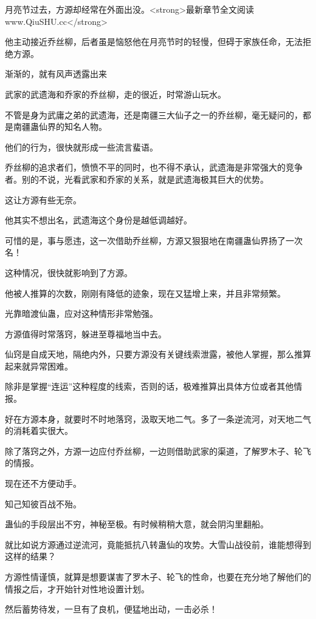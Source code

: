 
\begin{this_body}

月亮节过去，方源却经常在外面出没。<strong>最新章节全文阅读www.QiuSHU.cc</strong>

他主动接近乔丝柳，后者虽是恼怒他在月亮节时的轻慢，但碍于家族任命，无法拒绝方源。

渐渐的，就有风声透露出来

武家的武遗海和乔家的乔丝柳，走的很近，时常游山玩水。

不管是身为武庸之弟的武遗海，还是南疆三大仙子之一的乔丝柳，毫无疑问的，都是南疆蛊仙界的知名人物。

他们的行为，很快就形成一些流言蜚语。

乔丝柳的追求者们，愤愤不平的同时，也不得不承认，武遗海是非常强大的竞争者。别的不说，光看武家和乔家的关系，就是武遗海极其巨大的优势。

这让方源有些无奈。

他其实不想出名，武遗海这个身份是越低调越好。

可惜的是，事与愿违，这一次借助乔丝柳，方源又狠狠地在南疆蛊仙界扬了一次名！

这种情况，很快就影响到了方源。

他被人推算的次数，刚刚有降低的迹象，现在又猛增上来，并且非常频繁。

光靠暗渡仙蛊，应对这种情形非常勉强。

方源值得时常落窍，躲进至尊福地当中去。

仙窍是自成天地，隔绝内外，只要方源没有关键线索泄露，被他人掌握，那么推算起来就异常困难。

除非是掌握“连运”这种程度的线索，否则的话，极难推算出具体方位或者其他情报。

好在方源本身，就要时不时地落窍，汲取天地二气。多了一条逆流河，对天地二气的消耗着实很大。

除了落窍之外，方源一边应付乔丝柳，一边则借助武家的渠道，了解罗木子、轮飞的情报。

现在还不方便动手。

知己知彼百战不殆。

蛊仙的手段层出不穷，神秘至极。有时候稍稍大意，就会阴沟里翻船。

就比如说方源通过逆流河，竟能抵抗八转蛊仙的攻势。大雪山战役前，谁能想得到这样的结果？

方源性情谨慎，就算是想要谋害了罗木子、轮飞的性命，也要在充分地了解他们的情报之后，才开始针对性地设置计划。

然后蓄势待发，一旦有了良机，便猛地出动，一击必杀！


\end{this_body}
